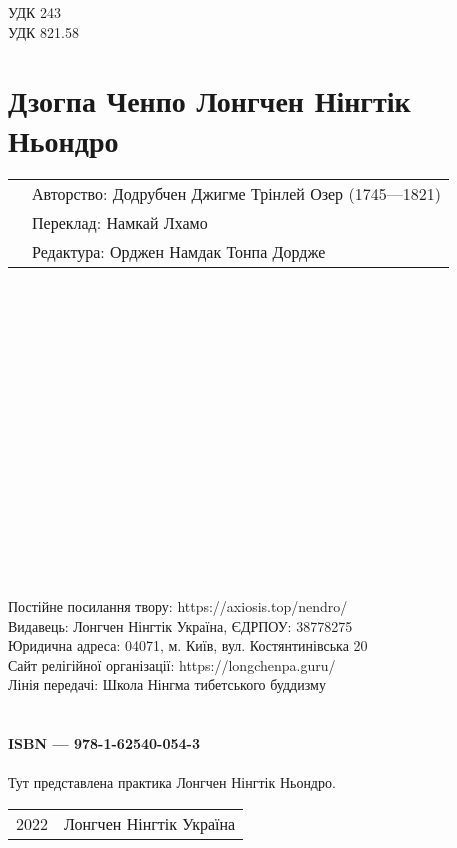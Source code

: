 УДК 243\\
УДК 821.58

\section*{Дзогпа Ченпо Лонгчен Нінгтік Ньондро}

\begin{tabular}{ll}
& Авторство: Додрубчен Джигме Трінлей Озер (1745—1821)\\
& Переклад: Намкай Лхамо\\
& Редактура: Орджен Намдак Тонпа Дордже\\
\end{tabular}
\\
\\
\\
\\
\\
\\
\\
\\
\\
\\
\\
\\
\\
\\
\\
\\
Постійне посилання твору: https://axiosis.top/nendro/ \\
Видавець: Лонгчен Нінгтік Україна, ЄДРПОУ: 38778275 \\
Юридична адреса: 04071, м. Київ, вул. Костянтинівська 20 \\
Сайт релігійної організації: https://longchenpa.guru/ \\
Лінія передачі: Школа Нінгма тибетського буддизму \\
\\
\\
{\bf  ISBN — 978-1-62540-054-3 \hspace{2em}}
\\
\\
Тут представлена практика Лонгчен Нінгтік Ньондро.
\\

\begin{tabular}{ll}
\textcopyright{} 2022 & Лонгчен Нінгтік Україна
\end{tabular}
